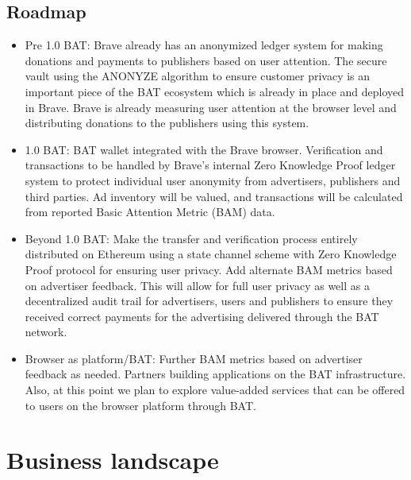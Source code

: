 \documentclass[11pt]{article}
\begin{document}
\subsection{Roadmap}
\label{sec-4-5}
\begin{itemize}
\item{Pre 1.0 \textrm{BAT}: Brave already has an anonymized ledger system for making donations and payments to publishers based on user attention. The secure vault using the ANONYZE algorithm to ensure customer privacy is an important piece of the \textrm{BAT} ecosystem which is already in place and deployed in Brave. Brave is already measuring user attention at the browser level and distributing donations to the publishers using this system.}
\item{1.0 \textrm{BAT}: \textrm{BAT} wallet integrated with the Brave browser. Verification and transactions to be handled by Brave's internal Zero Knowledge Proof ledger system to protect individual user anonymity from advertisers, publishers and third parties.  Ad inventory will be valued, and transactions will be calculated from reported Basic Attention Metric (BAM) data. }
\item{Beyond 1.0 \textrm{BAT}: Make the transfer and verification process entirely distributed on Ethereum using a state channel scheme with Zero Knowledge Proof protocol for ensuring user privacy. Add alternate BAM metrics based on advertiser feedback. This will allow for full user privacy as well as a decentralized audit trail for advertisers, users and publishers to ensure they received correct payments for the advertising delivered through the \textrm{BAT} network.}
\item{Browser as platform/\textrm{BAT}:  Further BAM metrics based on advertiser feedback as needed. Partners building applications on the \textrm{BAT} infrastructure. Also, at this point we plan to explore value-added services that can be offered to users on the browser platform through \textrm{BAT}.}
\end{itemize}


\section{Business landscape}
\label{sec-5}
\end{document}
